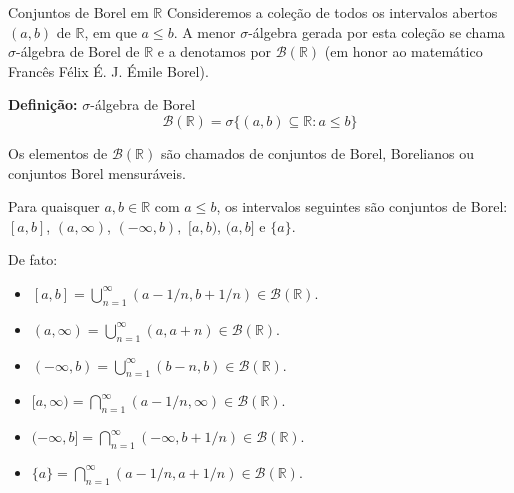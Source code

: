 %
%
%
%
%
%
%
%


\begin{frame}{Conjuntos de Borel em $\mathbb{R}$}
Consideremos a coleção de todos os intervalos abertos $(a,b)$ de $\mathbb{R}$, em que $a \leq b$.  A menor $\sigma$-álgebra gerada por esta coleção se chama $\sigma$-álgebra de Borel de $\mathbb{R}$ e a denotamos por $\mathcal{B}(\mathbb{R})$ (em honor ao  matemático Francês Félix É. J. Émile Borel).

\medskip	
\textbf{Definição:} $\sigma$-álgebra de Borel 
$$\mathcal{B}(\mathbb{R}) = \sigma \{ (a,b) \subseteq \mathbb{R} : a \leq b \}$$

Os elementos de $\mathcal{B}(\mathbb{R})$ são chamados de conjuntos de Borel, Borelianos ou conjuntos Borel mensuráveis.

\medskip
Para quaisquer $a, b \in \mathbb{R}$ com $a \leq b$, os intervalos seguintes são conjuntos de Borel: $[a,b]$, $(a,\infty)$, $(-\infty, b),$ $[a,b)$, $(a,b]$ e $\{a\}.$

De fato:
    \begin{itemize}
	\item $[a,b] = \bigcup\limits_{n=1}^{\infty}(a - 1/n, b + 1/n) \in \mathcal{B}(\mathbb{R})$.
	\item $(a,\infty) = \bigcup\limits_{n=1}^{\infty} (a, a+n) \in \mathcal{B}(\mathbb{R})$.
	\item $(-\infty, b) = \bigcup\limits_{n=1}^{\infty} (b-n,b) \in \mathcal{B}(\mathbb{R})$.
	\item $[a, \infty) = \bigcap\limits_{n=1}^{\infty} (a-1/n, \infty) \in \mathcal{B}(\mathbb{R})$.
	\item $(-\infty,b] = \bigcap\limits_{n=1}^{\infty} (-\infty,b+1/n) \in \mathcal{B}(\mathbb{R})$.
	\item $\{a\} = \bigcap\limits_{n=1}^{\infty}(a-1/n,a+1/n) \in \mathcal{B}(\mathbb{R})$.
\end{itemize}

\end{frame}
	

